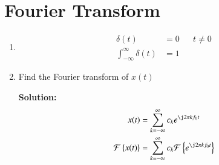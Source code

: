\documentclass[journal,12pt,twocolumn]{IEEEtran}
\newcommand{\solution}{\noindent \textbf{Solution: }}
\providecommand{\cbrak}[1]{\ensuremath{\left\{#1\right\}}}
\numberwithin{equation}{section}
\numberwithin{figure}{section}
\renewcommand\thesection{\arabic{section}}
\begin{document}
	\section{Fourier Transform}
	\begin{enumerate}[label=\thesection.\arabic*,ref=\thesection.\theenumi]
	\item 
	\begin{align}
		\delta(t) &= 0 && t \ne 0 \\
		\int_{-\infty}^{\infty} \delta(t) &= 1
	\end{align}

	\item Find the Fourier transform of $x(t)$

	\solution 
	\begin{align}
		x(t) &= \sum_{k=-\infty}^\infty c_k e^{\j 2\pi kf_0t} \\
		\mathcal{F}\cbrak{x(t)} &= \sum_{k=-\infty}^\infty c_k \mathcal{F}\cbrak{e^{\j 2\pi kf_0t}}
	\end{align}
	\end{enumerate}
	
\end{document}
